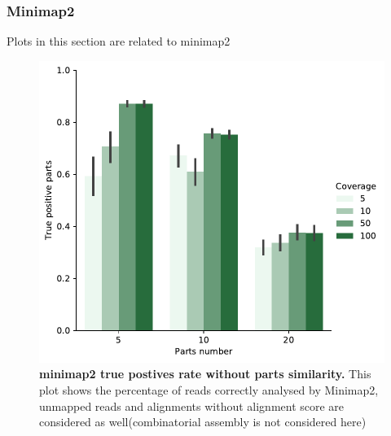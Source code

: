 \documentclass[11pt, a4paper]{article}
\begin{document}
\subsubsection{Minimap2}
Plots in this section are related  to minimap2

\begin{figure}[ht]
    \begin{center}
    \includegraphics[width=1\textwidth]{../results/images_notebook/v_400/minimap_sim_00_true_positive.pdf}
    \end{center}
    \caption{{\bf  minimap2 true postives rate without parts similarity.} This plot shows the percentage of reads correctly analysed by Minimap2, unmapped reads and alignments without alignment score are considered as well(combinatorial assembly is not considered here)}
   \label{fig:v_400_accuracy_sim_0}
\end{figure}
\end{document}
